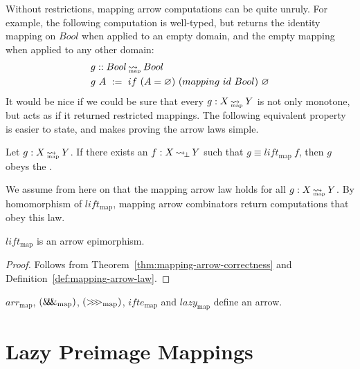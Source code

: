 \documentclass[preprint]{sigplanconf}
\newcommand{\arrow}{\rightsquigarrow}
\newcommand{\arrowlift}{\ensuremath{lift}}
\newcommand{\arrowarr}{\ensuremath{arr}}
\newcommand{\arrowcomp}{\ensuremath{{>}\mspace{-6mu}{>}\mspace{-6mu}{>}}}
\newcommand{\arrowpair}{\ensuremath{\mathit{\&\mspace{-7.5mu}\&\mspace{-7.5mu}\&}}}
\newcommand{\arrowif}{\ensuremath{ifte}}
\newcommand{\arrowlazy}{\ensuremath{lazy}}
\DeclareMathOperator{\botto}{\arrow_{\mspace{-3mu}\bot}}
\newcommand{\map}{_\mathrm{map}}
\DeclareMathOperator{\mapto}{\arrow_{\mspace{-21mu}\map}}
\newcommand{\liftmap}{\arrowlift\map}
\newcommand{\arrmap}{\arrowarr\map}
\newcommand{\compmap}{\arrowcomp\map}
\newcommand{\pairmap}{\arrowpair\map}
\newcommand{\ifmap}{\arrowif\map}
\newcommand{\lazymap}{\arrowlazy\map}
\begin{document}
Without restrictions, mapping arrow computations can be quite unruly.
For example, the following computation is well-typed, but returns the identity mapping on $Bool$ when applied to an empty domain, and the empty mapping when applied to any other domain:
\begin{equation}
\begin{aligned}
	&g :: Bool \mapto Bool \\
	&g~A \ := \ if~(A = \emptyset)~(mapping~id~Bool)~\emptyset
\end{aligned}
\end{equation}
It would be nice if we could be sure that every $g : X \mapto Y$ is not only monotone, but acts as if it returned restricted mappings.
The following equivalent property is easier to state, and makes proving the arrow laws simple.

\begin{definition}
Let $g : X \mapto Y$. If there exists an $f : X \botto Y$ such that $g \equiv \liftmap~f$, then $g$ obeys the .
\label{def:mapping-arrow-law}
\end{definition}

We assume from here on that the mapping arrow law holds for all $g : X \mapto Y$.
By homomorphism of $\liftmap$, mapping arrow combinators return computations that obey this law.

\begin{theorem}
$\liftmap$ is an arrow epimorphism.
\end{theorem}
\begin{proof}
Follows from Theorem~\ref{thm:mapping-arrow-correctness} and Definition~\ref{def:mapping-arrow-law}.
\end{proof}

\begin{corollary}
$\arrmap$, $(\pairmap)$, $(\compmap)$, $\ifmap$ and $\lazymap$ define an arrow.
\end{corollary}



\section{Lazy Preimage Mappings}
\label{sec:lazy-preimage-mappings}
\end{document}

